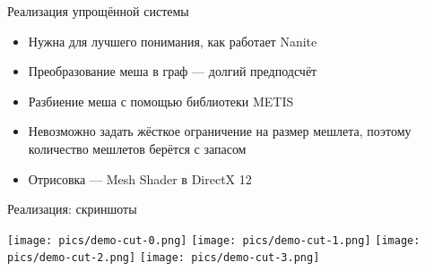 \begin{frame}{Реализация упрощённой системы}
    \begin{itemize}
        \item Нужна для лучшего понимания, как работает Nanite
        \item Преобразование меша в граф --- долгий предподсчёт
        \item Разбиение меша с помощью библиотеки METIS
        \item Невозможно задать жёсткое ограничение на размер мешлета, поэтому количество мешлетов берётся с запасом
        \item Отрисовка --- Mesh Shader в DirectX 12
    \end{itemize}
\end{frame}

\begin{frame}{Реализация: скриншоты}
    \begin{center}
        \texttt{[image: pics/demo-cut-0.png]}
        \texttt{[image: pics/demo-cut-1.png]}
        \texttt{[image: pics/demo-cut-2.png]}
        \texttt{[image: pics/demo-cut-3.png]}
    \end{center}
\end{frame}
